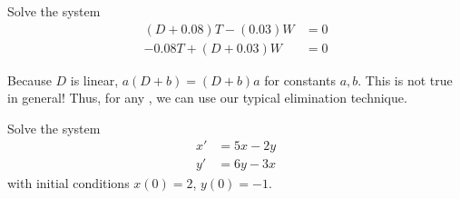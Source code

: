 \begin{applicationActivities}
\begin{activity}{15}
Solve the system
\begin{alignat*}{2}
(D+0.08)T-(0.03)W &= 0 \\
-0.08T + (D+0.03)W &= 0 
\end{alignat*}
\end{activity}

\begin{observation}
Because \(D\) is linear, \(a(D+b)=(D+b)a\) for constants \(a,b\).  This is not true in general!
\vfill
Thus, for any , we can use our typical elimination technique.
\end{observation}

\begin{activity}{15}
Solve the system
\begin{alignat*}{2}
x'&=5x-2y \\
y'&=6y-3x
\end{alignat*}
with initial conditions \(x(0)=2\), \(y(0)=-1\).
\end{activity}


\end{applicationActivities}
